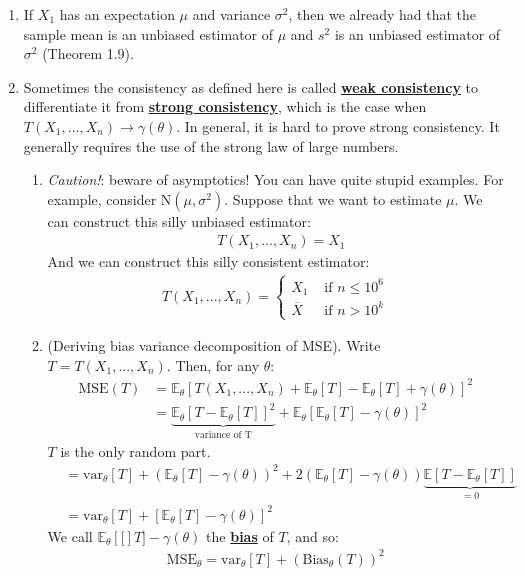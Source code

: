 \documentclass[11pt]{scrartcl}
\theoremstyle{definition}
\theoremstyle{remark}
\newcommand{\dfn}[1]{\textbf{\underline{#1}}}
\newcommand{\stat}[0]{T(X_1, ..., X_n )}
\newcommand{\EX}[1]{\mathbb{E}\left[#1 \right]}
\newcommand{\EXth}[1]{\mathbb{E}_\theta \left[ #1 \right]}
\begin{document}
\begin{enumerate}[noitemsep]
	\item If $X_1$ has an expectation $\mu$ and variance $\sigma^2$, then we already had that the sample mean is an unbiased estimator of $\mu$ and $s^2$ is an unbiased estimator of $\sigma^2$ (Theorem 1.9). 
	\item Sometimes the consistency as defined here is called \dfn{weak consistency} to differentiate it from \dfn{strong consistency}, which is the case when $\stat \rightarrow \gamma(\theta)$. In general, it is hard to prove strong consistency. It generally requires the use of the strong law of large numbers. 
	\begin{enumerate}[noitemsep]
		\item \emph{Caution!}: beware of asymptotics! You can have quite stupid examples. For example, consider N$(\mu, \sigma^2)$. Suppose that we want to estimate $\mu$. We can construct this silly unbiased estimator: 
		\begin{align*}	
			& T(X_1, ..., X_n) = X_1 
		\end{align*}
		And we can construct this silly consistent estimator: 
		\begin{align*} 
		 \stat = \begin{cases}
				X_1 & \text{ if } n \leq 10^6 \\
				\overline{X} & \text{ if } n > 10^k
			\end{cases}	
		\end{align*}
	\item (Deriving bias variance decomposition of MSE). Write $T = \stat$. Then, for any $\theta$: 
		\begin{align*}
				\text{MSE}(T) &  = \EXth{\stat + \EXth{T} - \EXth{T} + \gamma(\theta) }^2 \\
					& = \underbrace{\EXth{T - \EXth{T} }^2}_{\text{variance of T}} + \EXth{ \EXth{T} - \gamma(\theta) }^2 
		\end{align*}
		$T$ is the only random part. 
		\begin{align*}
			& = \text{var}_\theta[T] + (\EXth{T}- \gamma(\theta))^2 + 2(\EXth{T} - \gamma(\theta))\underbrace{\EX{T - \EXth{T}}}_{=0} \\
			& = \text{var}_\theta[T] + [\EXth{T} - \gamma(\theta)]^2 
		\end{align*}
		We call $\EXth[T]-\gamma(\theta)$ the \dfn{bias} of $T$, and so: 
		\begin{align}
			\text{MSE}_\theta = \text{var}_\theta[T] + (\text{Bias}_\theta(T))^2 
		\end{align}
	\end{enumerate}
\end{enumerate}
\end{document}
